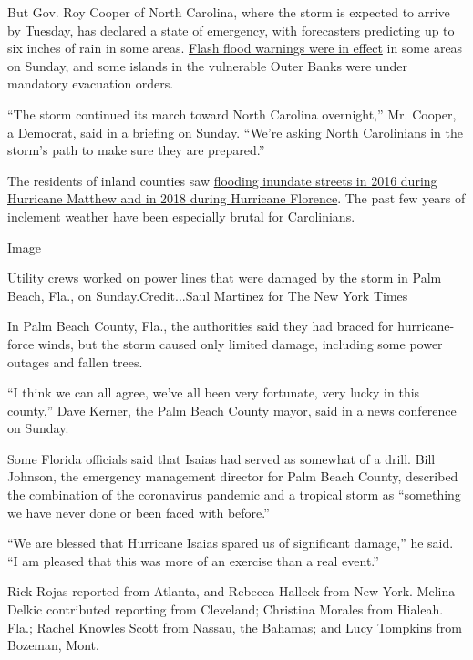 But Gov. Roy Cooper of North Carolina, where the storm is expected to
arrive by Tuesday, has declared a state of emergency, with forecasters
predicting up to six inches of rain in some areas.
\href{https://alerts.weather.gov/cap/wwacapget.php?x=NC125F5DA2F1C4.HurricaneLocalStatement.125F5DA42AA8NC.ILMHLSILM.3d2f501b896f05f00166a758bf00288a}{Flash
flood warnings were in effect} in some areas on Sunday, and some islands
in the vulnerable Outer Banks were under mandatory evacuation orders.

``The storm continued its march toward North Carolina overnight,'' Mr.
Cooper, a Democrat, said in a briefing on Sunday. ``We're asking North
Carolinians in the storm's path to make sure they are prepared.''

The residents of inland counties saw
\href{https://www.nytimes.com/2018/09/18/us/north-carolina-hurricanes-storms-history.html}{flooding
inundate streets in 2016 during Hurricane Matthew and in 2018 during
Hurricane Florence}. The past few years of inclement weather have been
especially brutal for Carolinians.

Image

Utility crews worked on power lines that were damaged by the storm in
Palm Beach, Fla., on Sunday.Credit...Saul Martinez for The New York
Times

In Palm Beach County, Fla., the authorities said they had braced for
hurricane-force winds, but the storm caused only limited damage,
including some power outages and fallen trees.

``I think we can all agree, we've all been very fortunate, very lucky in
this county,'' Dave Kerner, the Palm Beach County mayor, said in a news
conference on Sunday.

Some Florida officials said that Isaias had served as somewhat of a
drill. Bill Johnson, the emergency management director for Palm Beach
County, described the combination of the coronavirus pandemic and a
tropical storm as ``something we have never done or been faced with
before.''

``We are blessed that Hurricane Isaias spared us of significant
damage,'' he said. ``I am pleased that this was more of an exercise than
a real event.''

Rick Rojas reported from Atlanta, and Rebecca Halleck from New York.
Melina Delkic contributed reporting from Cleveland; Christina Morales
from Hialeah. Fla.; Rachel Knowles Scott from Nassau, the Bahamas; and
Lucy Tompkins from Bozeman, Mont.


